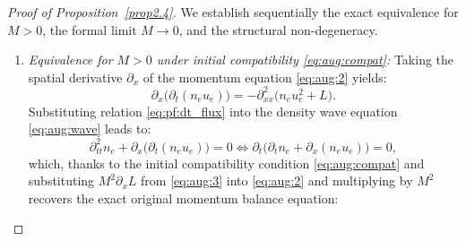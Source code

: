 \documentclass[pdflatex,final,10pt]{article}
\begin{document}

\begin{proof}[Proof of Proposition~\ref{prop2.4}] \label{prop2.4pf}
We establish sequentially the exact equivalence for $M > 0$, the formal limit $M \to 0$, and the structural non-degeneracy.
\begin{enumerate}
    \item \emph{Equivalence for $M > 0$ under initial compatibility \eqref{eq:aug:compat}:}
Taking the spatial derivative $\partial_x$ of the momentum equation \eqref{eq:aug:2} yields:
\begin{equation} \label{eq:pf:dt_flux}
    \partial_x \big( \partial_t (n_e u_e) \big) = -\partial^2_{xx} \big( n_e u_e^2 + L \big).
\end{equation}
Substituting relation \eqref{eq:pf:dt_flux} into the density wave equation \eqref{eq:aug:wave} leads to:
\begin{equation*}
    \partial^2_{tt} n_e + \partial_x \big( \partial_t (n_e u_e) \big) = 0 \iff \partial_t \Big( \partial_t n_e + \partial_x (n_e u_e) \Big) = 0,
\end{equation*}
%
which, thanks to the initial compatibility condition \eqref{eq:aug:compat} and substituting $M^2 \partial_x L$ from \eqref{eq:aug:3} into \eqref{eq:aug:2} and multiplying by $M^2$ recovers the exact original momentum balance equation:
\begin{equation*}

\end{equation*}
\end{enumerate}
\end{proof}
\end{document}
